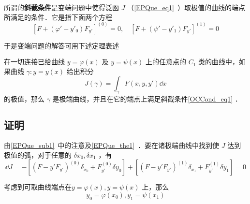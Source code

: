 
所谓的\textbf{斜截条件}是变端问题中使得泛函 $J$ （\autoref{EPQue_eq1}~）取极值的曲线的端点所满足的条件．它是指下面两个方程
\begin{equation}\label{OCCond_eq1}
[F+(\varphi'-y'_0)F_{y'}]^{(0)}=0,\quad [F+(\psi'-y'_1)F_{y'}]^{(1)}=0
\end{equation}

于是变端问题的解答可用下述定理表述
\begin{theorem}{}
在一切连接已给曲线 $y=\varphi(x)$ 及 $y=\psi(x)$ 上的任意点的 $C_1$ 类的曲线中，如果曲线 $\gamma:y=y(x)$ 给出积分
\begin{equation}
J(\gamma)=\int_{\gamma}F(x,y,y')\dd x
\end{equation}
的极值，那么 $\gamma$ 是极端曲线，并且在它的端点上满足斜截条件\autoref{OCCond_eq1} ．
\end{theorem}
\subsection{证明}
由\autoref{EPQue_sub1}~中的注意及\autoref{EPQue_the1}~．要在诸极端曲线中找到使 $J$ 达到极值的弧，对于任意的 $\delta x_0,\delta x_1$ ，有
\begin{equation}
\dd J=-[(F-y'F_{y'})^{(0)}\delta_{x_0}+ F_{y'}^{(0)}\delta y_0]+[(F-y'F_{y'})^{(1)}\delta_{x_1}+F_{y'}^{(1)}\delta y_1]=0
\end{equation}

 考虑到可取曲线端点在$y=\varphi(x),y=\psi(x)$ 上，那么
 \begin{equation}
 y_0=\varphi(x_0),y_1=\psi(x_1)
 \end{equation}
 